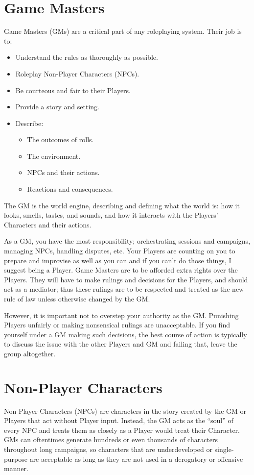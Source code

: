 \documentclass[../main.tex]{subfiles}
\begin{document}
    \section{Game Masters}

    Game Masters (GMs) are a critical part of any roleplaying system. Their job is to:

    \begin{itemize}
        \item Understand the rules as thoroughly as possible.
        \item Roleplay Non-Player Characters (NPCs).
        \item Be courteous and fair to their Players.
        \item Provide a story and setting.
        \item Describe:
        \begin{itemize}
            \item The outcomes of rolls.
            \item The environment.
            \item NPCs and their actions.
            \item Reactions and consequences.
        \end{itemize}
    \end{itemize}
    
    The GM is the world engine, describing and defining what the world is: how it looks, smells, tastes, and sounds, and how it interacts with the Players' Characters and their actions.
    
    As a GM, you have the most responsibility; orchestrating sessions and campaigns, managing NPCs, handling disputes, etc. Your Players are counting on you to prepare and improvise as well as you can and if you can't do those things, I suggest being a Player.
    Game Masters are to be afforded extra rights over the Players. They will have to make rulings and decisions for the Players, and should act as a mediator; thus these rulings are to be respected and treated as the new rule of law unless otherwise changed by the GM.

    However, it is important not to overstep your authority as the GM. Punishing Players unfairly or making nonsensical rulings are unacceptable. If you find yourself under a GM making such decisions, the best course of action is typically to discuss the issue with the other Players and GM and failing that, leave the group altogether.

    \section{Non-Player Characters}
    Non-Player Characters (NPCs) are characters in the story created by the GM or Players that act without Player input. Instead, the GM acts as the ``soul'' of every NPC and treats them as closely as a Player would treat their Character. GMs can oftentimes generate hundreds or even thousands of characters throughout long campaigns, so characters that are underdeveloped or single-purpose are acceptable as long as they are not used in a derogatory or offensive manner.
\end{document}
